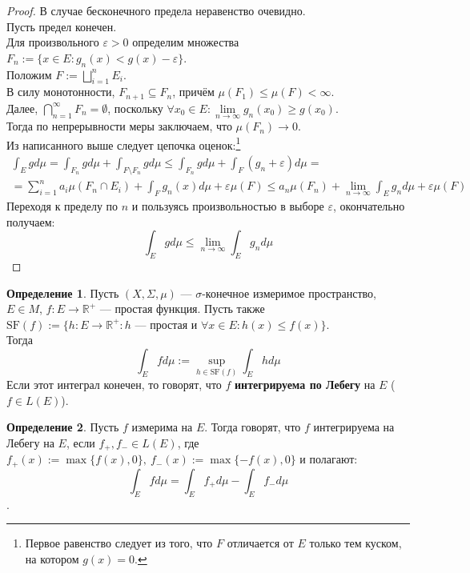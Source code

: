 \documentclass[11pt,a4paper]{report}
\def\eps{\varepsilon}
\def\Real{\mathbb{R}}
\theoremstyle{definition}
\theoremstyle{definition}
\theoremstyle{definition}
\newtheorem{definition}{Определение}[section]
\begin{document}
		\begin{proof}
			В случае бесконечного предела неравенство очевидно.\\
			Пусть предел конечен.\\ 
			Для произвольного $ \eps > 0 $ определим множества $ F_{n} := \{ x \in E: g_{n}(x) < g(x) - \eps \} $.\\
			Положим $ F := \bigsqcup\limits_{i=1}^{n} E_{i} $.\\
			В силу монотонности, $ F_{n+1} \subseteq F_{n}  $, причём $ \mu(F_{1}) \le \mu(F) < \infty $.\\ 
			Далее, $ \bigcap\limits_{n=1}^{\infty} F_{n} = \emptyset $, поскольку $ \forall x_{0} \in E: \lim\limits_{n \to \infty} g_{n}(x_{0}) \ge g(x_{0}) $.\\
			Тогда по непрерывности меры заключаем, что $ \mu(F_{n}) \to 0 $.\\
			Из написанного выше следует цепочка оценок:\footnote{Первое равенство следует из того, что $ F $ отличается от $ E $ только тем куском, на котором $ g(x) = 0 $.}
			\begin{gather*}
				\int_{E} g d\mu = \int_{F_{n}} g d\mu + \int_{F \setminus F_{n}} g d\mu \le \int_{F_{n}} g d\mu + \int_{F} (g_{n} + \eps) d\mu =\\= \sum\limits_{i=1}^{n} a_{i} \mu(F_{n} \cap E_{i}) + \int_{F} g_{n}(x) d\mu + \eps \mu(F) \le a_{n} \mu(F_{n}) + \lim\limits_{n\to\infty}\int_{E} g_{n} d\mu + \eps \mu(F)
			\end{gather*}
			Переходя к пределу по $ n $ и пользуясь произвольностью в выборе $ \eps $, окончательно получаем:
			\[ \int_{E} g d\mu \le \lim\limits_{n\to\infty}\int_{E} g_{n} d\mu \]
		\end{proof}
		\begin{definition}
			Пусть $ (X, \Sigma, \mu) $ — $ \sigma $-конечное измеримое пространство, $ E \in M $, $ f: E \to \Real^{+} $ — простая функция. Пусть также $ \mbox{SF}(f) := \{h: E \to \Real^{+}:  h\text{ — простая и } \forall x \in E: h(x) \le f(x) \} $.\\
			Тогда \[ \int_{E} f d\mu := \sup\limits_{h \in \mbox{SF}(f)} \int_{E} h d\mu \]
			Если этот интеграл конечен, то говорят, что $ f $ \textbf{интегрируема по Лебегу} на $ E $ ($ f \in L(E)$).
		\end{definition}
		\begin{definition}
			Пусть $ f $ измерима на $ E $. Тогда говорят, что $ f $ интегрируема на Лебегу на $ E $, если $ f_{+}, f_{-} \in L(E) $, где $ f_{+}(x) := \max \{f(x), 0\},\ f_{-}(x) := \max \{-f(x), 0\} $ и полагают: 
			\[ \int_{E} f d\mu = \int_{E} f_{+}d\mu - \int_{E} f_{-} d\mu \].
		\end{definition}
\end{document}
